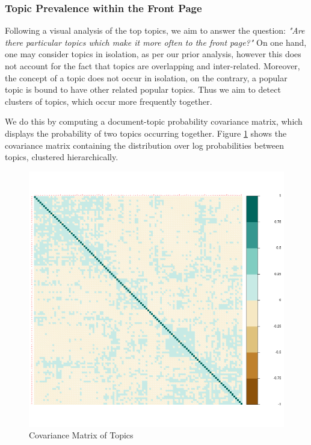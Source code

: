 \documentclass[11pt,journal,final,a4paper]{IEEEtran}
\begin{document}
\subsubsection{Topic Prevalence within the Front Page}
Following a visual analysis of the top topics, we aim to answer the question: \textit{"Are there particular topics which make it more often to the front page?"} On one hand, one may consider topics in isolation, as per our prior analysis, however this does not account for the fact that topics are overlapping and inter-related. Moreover, the concept of a topic does not occur in isolation, on the contrary, a popular topic is bound to have other related popular topics. Thus we aim to detect clusters of topics, which occur more frequently together.

We do this by computing a document-topic probability covariance matrix, which displays the probability of two topics occurring together. Figure \ref{covar} shows the covariance matrix containing the distribution over log probabilities between topics, clustered hierarchically.


\begin{figure}[!ht]
\centerline{\includegraphics[scale=0.3]{img/topic_model_03_allarticles_full_SMALL.png}}
\caption{Covariance Matrix of Topics}
\label{covar}
\end{figure}
\end{document}
